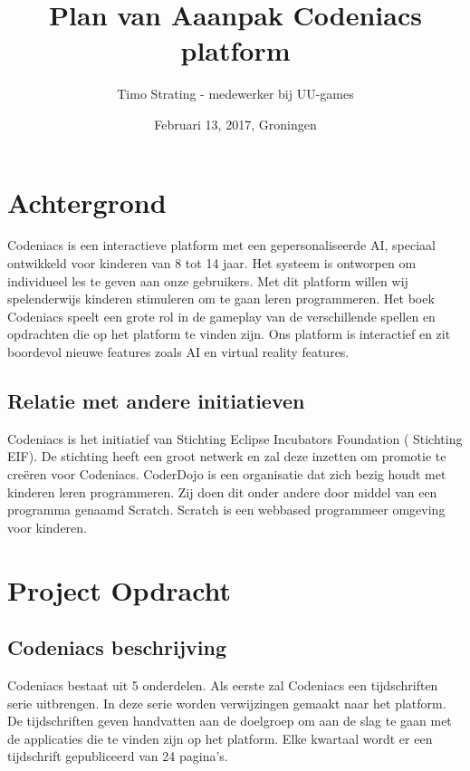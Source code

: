 \documentclass[]{report}
\title{Plan van Aaanpak Codeniacs platform}
\author{Timo Strating - medewerker bij UU-games}
\date{Februari 13, 2017, Groningen}
\begin{document}
\maketitle

\tableofcontents
\newpage






\chapter{Achtergrond}

Codeniacs is een interactieve platform met een gepersonaliseerde AI, speciaal ontwikkeld voor kinderen van 8 tot 14 jaar. Het systeem is ontworpen om individueel les te geven aan onze gebruikers. Met dit platform willen wij spelenderwijs kinderen stimuleren om te gaan leren programmeren. Het boek Codeniacs speelt een grote rol in de gameplay van de verschillende spellen en opdrachten die op het platform te vinden zijn. Ons platform is interactief en zit boordevol nieuwe features zoals AI en virtual reality features.

\section{Relatie met andere initiatieven}
Codeniacs is het initiatief van Stichting Eclipse Incubators Foundation ( Stichting EIF). De stichting heeft een groot netwerk en zal deze inzetten om promotie te creëren voor Codeniacs. CoderDojo is een organisatie dat zich bezig houdt met kinderen leren programmeren. Zij doen dit onder andere door middel van een programma genaamd Scratch. Scratch is een webbased programmeer omgeving voor kinderen.




\chapter{Project Opdracht}

\section{Codeniacs beschrijving}
Codeniacs bestaat uit 5 onderdelen. Als eerste zal Codeniacs een tijdschriften serie uitbrengen. In deze serie worden verwijzingen gemaakt naar het platform. De tijdschriften geven handvatten aan de doelgroep om aan de slag te gaan met de applicaties die te vinden zijn op het platform. Elke kwartaal wordt er een tijdschrift gepubliceerd van 24 pagina's.
\end{document}
